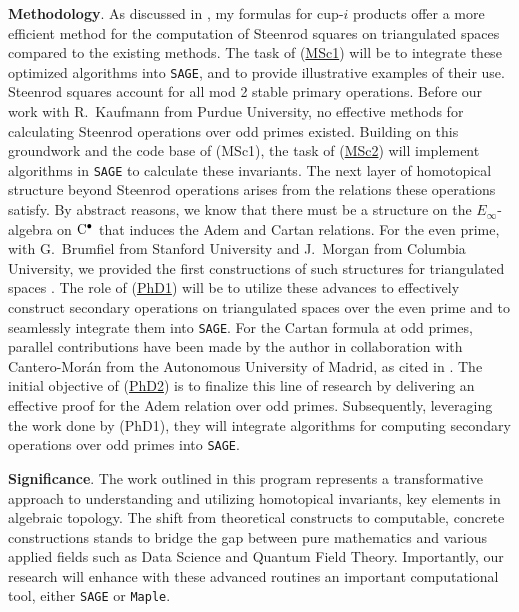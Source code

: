 \smallskip\textbf{Methodology}.
As discussed in \cite{medina2023fast_sq}, my formulas for cup-$i$ products offer a more efficient method for the computation of Steenrod squares on triangulated spaces compared to the existing methods.
The task of (\underline{MSc1}) will be to integrate these optimized algorithms into \texttt{SAGE}, and to provide illustrative examples of their use.
Steenrod squares account for all mod 2 stable primary operations.
Before our work \cite{medina2021may_st} with R.~Kaufmann from Purdue University, no effective methods for calculating Steenrod operations over odd primes existed.
Building on this groundwork and the code base of (MSc1), the task of (\underline{MSc2}) will implement algorithms in \texttt{SAGE} to calculate these invariants.
The next layer of homotopical structure beyond Steenrod operations arises from the relations these operations satisfy.
By abstract reasons, we know that there must be a structure on the $E_\infty$-algebra on $\mathrm{C}^\bullet$ that induces the Adem and Cartan relations.
For the even prime, with G.~Brumfiel from Stanford University and J.~Morgan from Columbia University, we provided the first constructions of such structures for triangulated spaces \cite{medina2020cartan, medina2021adem}.
The role of (\underline{PhD1}) will be to utilize these advances to effectively construct secondary operations on triangulated spaces over the even prime and to seamlessly integrate them into \texttt{SAGE}.
For the Cartan formula at odd primes, parallel contributions have been made by the author in collaboration with Cantero-Mor\'an from the Autonomous University of Madrid, as cited in \cite{medina2023oddcartan}.
The initial objective of (\underline{PhD2}) is to finalize this line of research by delivering an effective proof for the Adem relation over odd primes.
Subsequently, leveraging the work done by (PhD1), they will integrate algorithms for computing secondary operations over odd primes into \texttt{SAGE}.

\smallskip\textbf{Significance}.
The work outlined in this program represents a transformative approach to understanding and utilizing homotopical invariants, key elements in algebraic topology.
The shift from theoretical constructs to computable, concrete constructions stands to bridge the gap between pure mathematics and various applied fields such as Data Science and Quantum Field Theory.
Importantly, our research will enhance with these advanced routines an important computational tool, either \texttt{SAGE} or \texttt{Maple}.